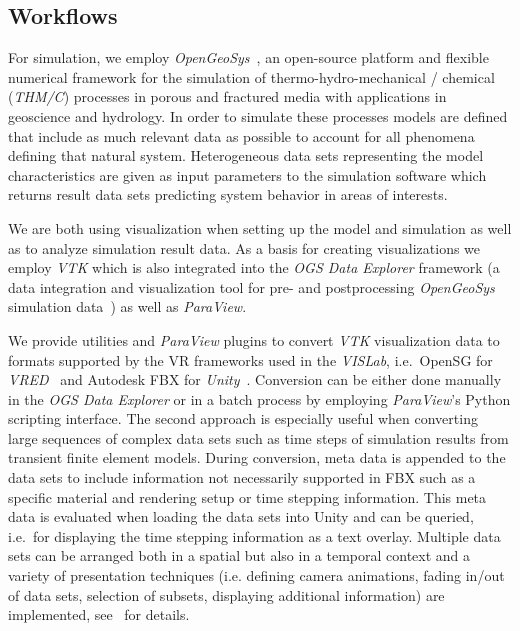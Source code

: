 \documentclass[twocolumn]{svjour3}          %
\begin{document}
\subsection{Workflows}
\label{workflows}

For simulation, we employ \emph{OpenGeoSys}~\cite{kolditz:ogs}, an open-source platform and flexible numerical framework for the simulation of thermo-hydro-mechanical / chemical (\emph{THM/C}) processes in porous and fractured media with applications in geoscience and hydrology. In order to simulate these processes models are defined that include as much relevant data as possible to account for all phenomena defining that natural system. Heterogeneous data sets representing the model characteristics are given as input parameters to the simulation software which returns result data sets predicting system behavior in areas of interests.

We are both using visualization when setting up the model and simulation as well as to analyze simulation result data. As a basis for creating visualizations we employ \emph{VTK} which is also integrated into the \emph{OGS Data Explorer} framework (a data integration and visualization tool for pre- and postprocessing \emph{OpenGeoSys} simulation data~\cite{rink:eesenvirvis}) as well as \emph{ParaView}.

We provide utilities and \emph{ParaView} plugins to convert \emph{VTK} visualization data to formats supported by the VR frameworks used in the \emph{VISLab}, i.e.~OpenSG for \emph{VRED}~\cite{bilke:vtkosgconverter} and Autodesk FBX for \emph{Unity}~\cite{bilke:vtkfbxconverter}. Conversion can be either done manually in the \emph{OGS Data Explorer} or in a batch process by employing \emph{ParaView}'s Python scripting interface. The second approach is especially useful when converting large sequences of complex data sets such as time steps of simulation results from transient finite element models. During conversion, meta data is appended to the data sets to include information not necessarily supported in FBX such as a specific material and rendering setup or time stepping information. This meta data is evaluated when loading the data sets into Unity and can be queried, i.e.~for displaying the time stepping information as a text overlay. Multiple data sets can be arranged both in a spatial but also in a temporal context and a variety of presentation techniques (i.e. defining camera animations, fading in/out of data sets, selection of subsets, displaying additional information) are implemented, see~\cite{rink:eesenvirvis} for details.
\end{document}
